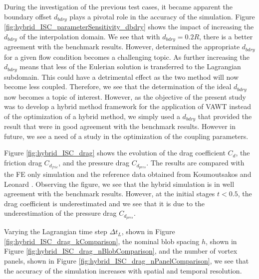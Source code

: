 During the investigation of the previous test cases, it became apparent the boundary offset $d_{bdry}$ plays a pivotal role in the accuracy of the simulation. Figure \ref{fig:hybrid_ISC_parameterSensitivity_dbdry} shows the impact of increasing the $d_{bdry}$ of the interpolation domain. We see that with $d_{bdry}=0.2R$, there is a better agreement with the benchmark results. However, determined the appropriate $d_{bdry}$ for a given flow condition becomes a challenging topic. As further increasing the $d_{bdry}$ means that less of the Eulerian solution is transferred to the Lagrangian subdomain. This could have a detrimental effect as the two method will now become less coupled. Therefore, we see that the determination of the ideal $d_{bdry}$ now becomes a topic of interest. However, as the objective of the  present study was to develop a hybrid method framework for the application of VAWT instead of the optimization of a hybrid method, we simply used a $d_{bdry}$ that provided the result that were in good agreement with the benchmark results. However in future, we see a need of a study in the optimization of the coupling parameters.


Figure \ref{fig:hybrid_ISC_drag} shows the evolution of the drag coefficient $C_d$, the friction drag $C_{d_{fric}}$, and the pressure drag $C_{d_{pres}}$. The results are compared with the FE only simulation and the reference data obtained from Koumoutsakos and Leonard \cite{Koumoutsakos1995a}. Observing the figure, we see that the hybrid simulation is in well agreement with the benchmark results. However, at the initial stages $t<0.5$, the drag coefficient is underestimated and we see that it is due to the underestimation of the pressure drag $C_{d_{pres}}$.

Varying the Lagrangian time step $\Delta t_L$, shown in Figure \ref{fig:hybrid_ISC_drag_kComparison}, the nominal blob spacing $h$, shown in Figure \ref{fig:hybrid_ISC_drag_nBlobComparison}, and the number of vortex panels, shown in Figure \ref{fig:hybrid_ISC_drag_nPanelComparison}, we see that the accuracy of the simulation increases with spatial and temporal resolution. 

